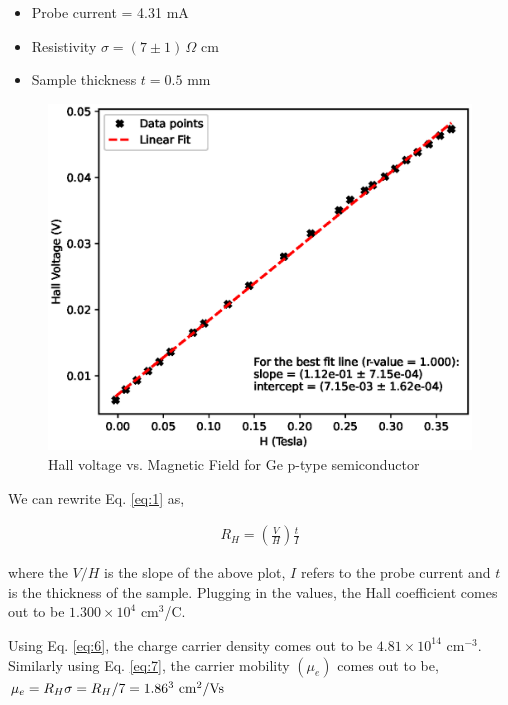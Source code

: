 \begin{itemize}
    \item Probe current = 4.31 mA
    \item Resistivity $\sigma = (7 \pm 1)\,\Omega$ cm 
    \item Sample thickness $t= 0.5$ mm
\end{itemize}


\begin{figure}[H]
    \centering
    \includegraphics[width=1\columnwidth]{images/ge-p.eps}
    \caption{Hall voltage vs. Magnetic Field for Ge p-type semiconductor}
    \label{fig:geP}
\end{figure}

We can rewrite Eq. \ref{eq:1} as,

\begin{align}
    R_H = \left(\frac{V}{H}\right)\frac{t}{I}
\end{align}

where the $V/H$ is the slope of the above plot, $I$ refers to the probe current and $t$ is the thickness of the sample. Plugging in the values, the Hall coefficient comes out to be $1.300 \times 10^4$ cm$^3$/C. 

Using Eq. \ref{eq:6}, the charge carrier density comes out to be $4.81 \times 10^{14}$ cm$^{-3}$. Similarly using Eq. \ref{eq:7}, the carrier mobility $(\mu_e)$ comes out to be,
$\mu_e = R_H\sigma=R_H / 7 = 1.86 \time 10^3\text{ cm}^2/\text{Vs}$


